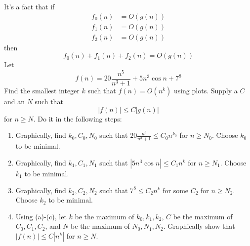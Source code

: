 It's a fact that if
\begin{align*}
  f_0(n) &= O(g(n)) \\
  f_1(n) &= O(g(n)) \\
  f_2(n) &= O(g(n))
\end{align*}
then
\[
f_0(n) + f_1(n) + f_2(n) = O(g(n))
\]
Let 
\[
f(n) = 20 \frac{n^5}{n^3 + 1} + 5n^3 \cos n + 7^8
\]
Find the smallest integer $k$ such that $f(n) = O(n^k)$ using
plots.
Supply a $C$ and an $N$ such that 
\[
|f(n)| \leq C |g(n)|
\]
for $n \geq N$.
Do it in the following steps:
\begin{enumerate}[nosep,label=(\alph*)]
\item
  Graphically, find $k_0,C_0, N_0$ such that
  $\displaystyle 20 \frac{n^5}{n^3 + 1} \leq C_0 n^{k_0}$ 
  for $n \geq N_0$.
  Choose $k_0$ to be minimal.
\item 
  Graphically, find $k_1,C_1, N_1$ such that
  $|5n^3 \cos n| \leq C_1n^k$ 
  for $n \geq N_1$.
  Choose $k_1$ to be minimal.
\item
  Graphically, find $k_2,C_2, N_2$ such that
  $7^8 \leq C_2n^k$ for some $C_2$
  for $n \geq N_2$.
  Choose $k_2$ to be minimal.
\item
  Using (a)-(c),
  let $k$ be the maximum of $k_0,k_1,k_2$,
  $C$ be the maximum of $C_0,C_1,C_2$, and
  $N$ be the maximum of $N_0,N_1,N_2$.
  Graphically show that $|f(n)| \leq C|n^k|$ for $n \geq N$. 
\end{enumerate}
